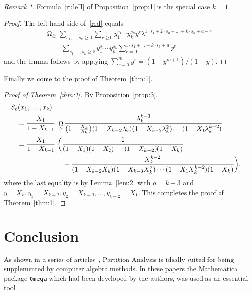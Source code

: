 \documentclass[reqno]{amsart}
\newcommand{\lam}{\lambda}
\DeclareMathOperator*{\Omegaoper}{\Omega}
\newcommand{\Omegaop}{\Omegaoper_{\scriptscriptstyle \geqq}}
\theoremstyle{plain}
\theoremstyle{definition}
\theoremstyle{remark}
\newtheorem*{remark}{Remark}
\begin{document}
\begin{remark}
   Formula~\eqref{ruleII} of Proposition~\ref{prop:1} is the special case $k=1$.
\end{remark}

\begin{proof}
   The left hand-side of~\eqref{red} equals
   \begin{align*}
      & \Omegaop \sum_{s_1,\dots,s_k \ge 0} \sum_{r \ge 0} y_1^{s_1}
      \cdots y_k^{s_k} y^r \lam^{1 \cdot s_1 + 2 \cdot s_2 + \dots +
      k \cdot s_k+a-r}\\
      & \quad = \sum_{s_1,\dots,s_k \ge 0} y_1^{s_1} \cdots y_k^{s_k}
      \sum_{r=0}^{1 \cdot s_1 + \dots + k \cdot s_k+a} y^r
   \end{align*}
   and the lemma follows by applying $\sum_{r=0}^m y^r =
   (1-y^{m+1})/(1-y)$.
\end{proof}

Finally we come to the proof of Theorem~\ref{thm:1}.

\begin{proof}[Proof of Theorem~\textup{\ref{thm:1}}]
   By Proposition~\ref{prop:3},
   \begin{align*}
      & S_k(x_1,\dots,x_k) \\
      & \quad = \frac{X_1}{1-X_{k-1}} \; \Omegaop \frac{\lam_k^{k-3}}
      {\big(1-\frac{X_k}{\lam_k}\big)(1-X_{k-2} \lam_k)
      (1-X_{k-3} \lam_k^2)\cdots(1-X_1 \lam_k^{k-2})}\\
      & \quad = \frac{X_1}{1-X_{k-1}} \; \bigg( \frac{1}{(1-X_1)(1-X_2)
      \cdots (1-X_{k-2})(1-X_k)}\\
      & \hspace*{18ex} - \frac{X_k^{k-2}}{(1-X_{k-2}X_k)
      (1-X_{k-3}X_k^2) \cdots (1-X_1 X_k^{k-2})(1-X_k)} \bigg),
   \end{align*}
   where the last equality is by Lemma~\ref{lem:2} with $a=k-3$
   and $y=X_k, y_1=X_{k-2}, y_2=X_{k-3},\dots,y_{k-2}=X_1$.
   This completes the proof of Theorem~\ref{thm:1}.
\end{proof}


\section{Conclusion} \label{sec:conclusion}

As shown in a series of articles~\cite{APR:Omega3,APR:Omega6,APR:Omega7,APR:Omeg
a8,APR:Omega5},
Partition Analysis is ideally suited for being supplemented by
computer algebra methods. In these papers the \textsf{Mathematica} package
\texttt{Omega} which had been developed by the authors, was used as
an essential tool.
\end{document}
